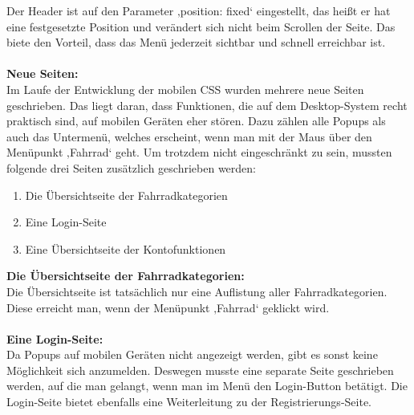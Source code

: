 Der Header ist auf den Parameter ‚position: fixed‘ eingestellt, das heißt er hat eine festgesetzte Position und verändert sich nicht beim Scrollen der Seite. Das biete den Vorteil, dass das Menü jederzeit sichtbar und schnell erreichbar ist.
\\ \\
\textbf{Neue Seiten:}
\\
Im Laufe der Entwicklung der mobilen CSS wurden mehrere neue Seiten geschrieben. Das liegt daran, dass Funktionen, die auf dem Desktop-System recht praktisch sind, auf mobilen Geräten eher stören. Dazu zählen alle Popups als auch das Untermenü, welches erscheint, wenn man mit der Maus über den Menüpunkt ‚Fahrrad‘ geht. Um trotzdem nicht eingeschränkt zu sein, mussten folgende drei Seiten zusätzlich geschrieben werden:
\begin{enumerate}
\item Die Übersichtseite der Fahrradkategorien 
\item Eine Login-Seite
\item Eine Übersichtseite der Kontofunktionen
\end{enumerate}
\textbf{Die Übersichtseite der Fahrradkategorien:}
\\
Die Übersichtseite ist tatsächlich nur eine Auflistung aller Fahrradkategorien. Diese erreicht man, wenn der Menüpunkt ‚Fahrrad‘ geklickt wird. 
\\ \\
\textbf{Eine Login-Seite:}
\\
Da Popups auf mobilen Geräten nicht angezeigt werden, gibt es sonst keine Möglichkeit sich anzumelden. Deswegen musste eine separate Seite geschrieben werden, auf die man gelangt, wenn man im Menü den Login-Button betätigt. Die Login-Seite bietet ebenfalls eine Weiterleitung zu der Registrierungs-Seite.

